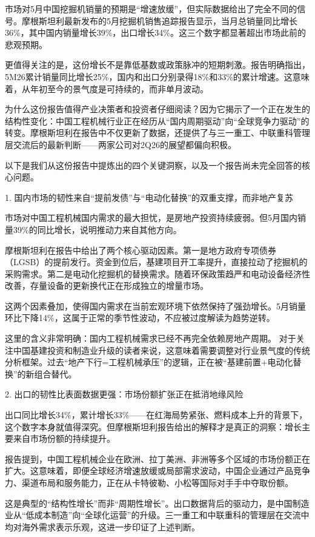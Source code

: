\documentclass[11pt]{ctexart}
\begin{document}
市场对5月中国挖掘机销量的预期是“增速放缓”，但实际数据给出了完全不同的信号。摩根斯坦利最新发布的5月挖掘机销售追踪报告显示，当月总销量同比增长36\%，其中国内销量增长39\%，出口增长34\%。这三个数字都显著超出市场此前的悲观预期。

更值得关注的是，这份增长不是靠低基数或政策脉冲的短期刺激。报告明确指出，5M26累计销量同比增长25\%，国内和出口分别录得18\%和33\%的累计增速。这意味着，从年初至今的景气度是可持续的，而非单月波动。

为什么这份报告值得产业决策者和投资者仔细阅读？因为它揭示了一个正在发生的结构性变化：中国工程机械行业正在经历从“国内周期驱动”向“全球竞争力驱动”的转变。摩根斯坦利在报告中不仅更新了数据，还提供了与三一重工、中联重科管理层交流后的最新判断——两家公司对2Q26的展望都偏向积极。

以下是我们从这份报告中提炼出的四个关键洞察，以及一个报告尚未完全回答的核心问题。

1. 国内市场的韧性来自“提前发债”与“电动化替换”的双重支撑，而非地产复苏

市场对中国工程机械国内需求的最大担忧，是房地产投资持续疲弱。但5月国内销量39\%的同比增长，说明推动力来自其他方向。

摩根斯坦利在报告中给出了两个核心驱动因素。第一是地方政府专项债券（LGSB）的提前发行。资金到位后，基建项目开工率提升，直接拉动了挖掘机的采购需求。第二是电动化挖掘机的替换需求。随着环保政策趋严和电动设备经济性改善，存量设备的更新换代正在形成独立的增量市场。

这两个因素叠加，使得国内需求在当前宏观环境下依然保持了强劲增长。5月销量环比下降14\%，这属于正常的季节性波动，不应被过度解读为趋势逆转。

这里的含义非常明确：国内工程机械需求已经不再完全依赖房地产周期。 对于关注中国基建投资和制造业升级的读者来说，这意味着需要调整对行业景气度的传统分析框架。过去“地产下行=工程机械承压”的逻辑，正在被“基建前置+电动化替换”的新组合替代。

2. 出口的韧性比表面数据更强：市场份额扩张正在抵消地缘风险

出口同比增长34\%，累计增长33\%——在红海局势紧张、燃料成本上升的背景下，这个数字本身就值得深究。但摩根斯坦利报告给出的解释才是真正的洞察：增长主要来自市场份额的持续提升。

报告提到，中国工程机械企业在欧洲、拉丁美洲、非洲等多个区域的市场份额正在扩大。这意味着，即便全球经济增速放缓或局部需求波动，中国企业通过产品竞争力、渠道布局和服务能力，正在从卡特彼勒、小松等国际对手手中夺取份额。

这是典型的“结构性增长”而非“周期性增长”。出口数据背后的驱动力，是中国制造业从“低成本制造”向“全球化运营”的升级。三一重工和中联重科的管理层在交流中均对海外需求表示乐观，这进一步印证了上述判断。
\end{document}
